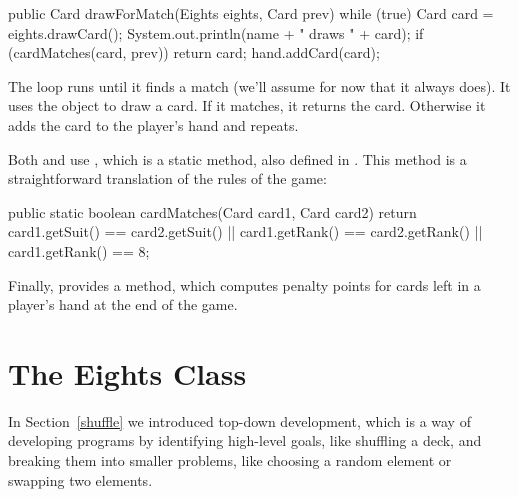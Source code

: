 \begin{code}
public Card drawForMatch(Eights eights, Card prev) {
    while (true) {
        Card card = eights.drawCard();
        System.out.println(name + " draws " + card);
        if (cardMatches(card, prev)) {
            return card;
        }
        hand.addCard(card);
    }
}
\end{code}

The  loop runs until it finds a match (we'll assume for now that it always does).
It uses the  object to draw a card.
If it matches, it returns the card.
Otherwise it adds the card to the player's hand and repeats.

Both  and  use , which is a static method, also defined in .
This method is a straightforward translation of the rules of the game:

\begin{code}
public static boolean cardMatches(Card card1, Card card2) {
    return card1.getSuit() == card2.getSuit()
        || card1.getRank() == card2.getRank()
        || card1.getRank() == 8;
}
\end{code}

Finally,  provides a  method, which computes penalty points for cards left in a player's hand at the end of the game.



\section{The Eights Class}


In Section~\ref{shuffle} we introduced top-down development, which is a way of developing programs by identifying high-level goals, like shuffling a deck, and breaking them into smaller problems, like choosing a random element or swapping two elements.


